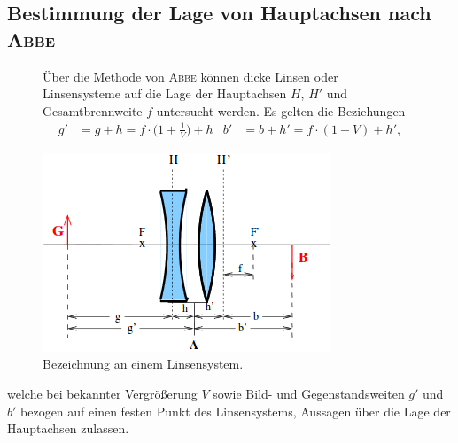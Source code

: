 \subsection{Bestimmung der Lage von Hauptachsen nach \texorpdfstring{\textsc{Abbe}}{Abbe}}
\label{sec:theorie2}
\begin{figure}[h!]
	\begin{minipage}[r,t]{0.6\textwidth}
		Über die Methode von \textsc{Abbe} können dicke Linsen oder Linsensysteme auf die Lage der Hauptachsen $H$, $H'$ und Gesamtbrennweite $f$ untersucht werden. 
		Es gelten die Beziehungen
		\begin{subequations}
			\begin{align}
			g'&=g+h =f\cdot\biggl(1+\frac{1}{V}\biggr)+h
			\end{align}
			\begin{align}
			b'&=b+h' =f\cdot(1+V)+h',
			\end{align}
			\label{eq:abbe}
		\end{subequations}
	\end{minipage}
	\begin{minipage}[l,t]{0.4\textwidth}
		\hfill
		\includegraphics[width=\textwidth]{Bilder/dickelinseHELENA.png}
		\caption{Bezeichnung an einem Linsensystem. \cite{skript}}
		\label{fig:label}
	\end{minipage}
\end{figure}
welche bei bekannter Vergrößerung $V$ sowie Bild- und Gegenstandsweiten $g'$ und $b'$ bezogen auf einen festen Punkt des Linsensystems, Aussagen über die Lage der Hauptachsen zulassen. 
\vspace{1cm}
